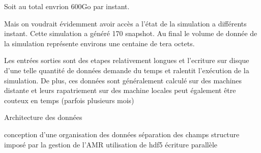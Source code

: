 Soit au total envrion 600Go par instant.

Mais on voudrait évidemment avoir accès a l'état de la simulation a différents instant.
Cette simulation a généré 170 snapshot.
Au final le volume de donnée de la simulation représente environs une centaine de tera octets.

Les entrées sorties sont des etapes relativement longues et l'ecriture sur disque d'une telle quantité de données demande du temps et ralentit l'exécution de la simulation.
De plus, ces données sont généralement calculé sur des machines distante et leurs rapatriement sur des machine locales peut également être couteux en temps (parfois plusieurs mois)

Architecture des données 

conception d'une organisation des données
séparation des champs
structure imposé par la gestion de l'AMR
utilisation de hdf5
écriture parallèle

%
